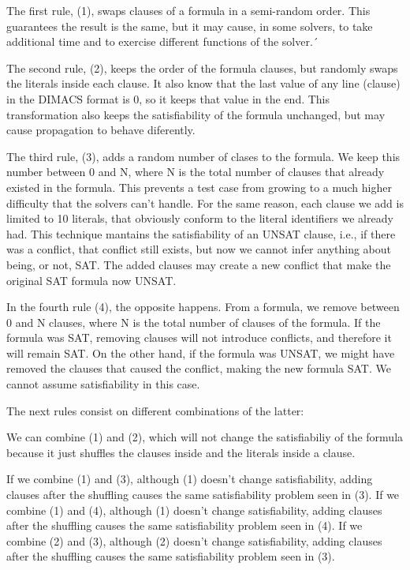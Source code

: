 The first rule, (1), swaps clauses of a formula in a semi-random order. This guarantees the result is the same, but it may cause, in some solvers, to take additional time 
and to exercise different functions of the solver.´

The second rule, (2), keeps the order of the formula clauses, but randomly swaps the literals inside each clause. It also know that the last value of any line (clause) in the 
DIMACS format is 0, so it keeps that value in the end. This transformation also keeps the satisfiability of the formula unchanged, but may cause propagation to behave diferently.

The third rule, (3), adds a random number of clases to the formula. We keep this number between 0 and N, where N is the total number of clauses that already existed in the formula.
This prevents a test case from growing to a much higher difficulty that the solvers can't handle. For the same reason, each clause we add is limited to 10 literals, that obviously 
conform to the literal identifiers we already had. 
This technique mantains the satisfiability of an UNSAT clause, i.e., if there was a conflict, that conflict still exists, but now we cannot infer anything about being, or not, SAT.
The added clauses may create a new conflict that make the original SAT formula now UNSAT.

In the fourth rule (4), the opposite happens. From a formula, we remove between 0 and N clauses, where N is the total number of clauses of the formula.
If the formula was SAT, removing clauses will not introduce conflicts, and therefore it will remain SAT. On the other hand, if the formula was UNSAT, we might have
removed the clauses that caused the conflict, making the new formula SAT. We cannot assume satisfiability in this case.

The next rules consist on different combinations of the latter:

We can combine (1) and (2), which will not change the satisfiabiliy of the formula because it just shuffles the clauses inside and the literals inside a clause.

If we combine (1) and (3), although (1) doesn't change satisfiability, adding clauses after the shuffling causes the same satisfiability problem seen in (3).
If we combine (1) and (4), although (1) doesn't change satisfiability, adding clauses after the shuffling causes the same satisfiability problem seen in (4).
If we combine (2) and (3), although (2) doesn't change satisfiability, adding clauses after the shuffling causes the same satisfiability problem seen in (3).

